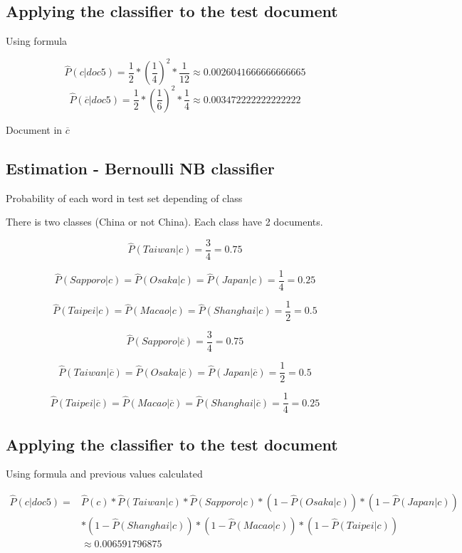 \documentclass{article}
\begin{document}
\subsection{Applying the classifier to the test document}

Using formula

\[\hat{P}(c|doc5) = \frac{1}{2} * (\frac{1}{4})^2 * \frac{1}{12} \approx 0.0026041666666666665\]
\[\hat{P}(\overline{c}|doc5)  = \frac{1}{2} * (\frac{1}{6})^2 * \frac{1}{4} \approx 0.003472222222222222\]

Document in $\overline{c}$

\subsection{Estimation - Bernoulli NB classifier}
Probability of each word in test set depending of class

There is two classes (China or not China). Each class have 2 documents.

\[\hat{P}(Taiwan|c) = \frac{3}{4} = 0.75\]

\[\hat{P}(Sapporo|c) = \hat{P}(Osaka|c) = \hat{P}(Japan|c) = \frac{1}{4} = 0.25\]

\[\hat{P}(Taipei|c) = \hat{P}(Macao|c) = \hat{P}(Shanghai|c) = \frac{1}{2} = 0.5\]

\[\hat{P}(Sapporo|\overline{c}) = \frac{3}{4} = 0.75\]

\[\hat{P}(Taiwan|\overline{c}) = \hat{P}(Osaka|\overline{c}) = \hat{P}(Japan|\overline{c}) = \frac{1}{2} = 0.5\]

\[\hat{P}(Taipei|\overline{c}) = \hat{P}(Macao|\overline{c}) = \hat{P}(Shanghai|\overline{c}) = \frac{1}{4} = 0.25\]


\subsection{Applying the classifier to the test document}

Using formula and previous values calculated

\begin{equation}
    \begin{aligned}
\hat{P}(c|doc5) = {} & \hat{P}(c) * \hat{P}(Taiwan|c) *  \hat{P}(Sapporo|c) * (1 - \hat{P}(Osaka|c) ) * (1-\hat{P}(Japan|c) ) \\
& * (1 - \hat{P}(Shanghai|c) ) * (1-\hat{P}(Macao|c) ) * (1 - \hat{P}(Taipei|c) ) \\ & \approx 0.006591796875
 \end{aligned}
\end{equation}
\end{document}
